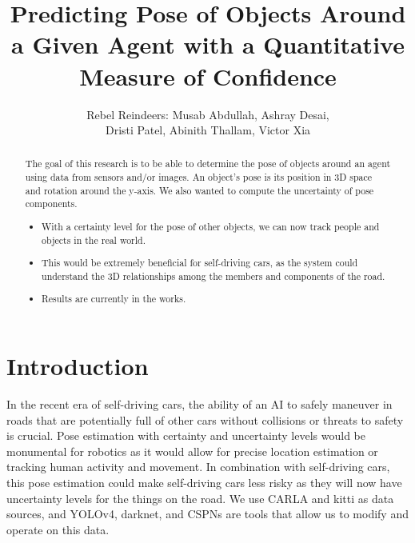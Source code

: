 \documentclass{article}
\title{Predicting Pose of Objects Around a Given Agent with a Quantitative Measure of Confidence}
\author{Rebel Reindeers: Musab Abdullah, Ashray Desai, \\Dristi Patel, Abinith Thallam, Victor Xia}
\date{}
\begin{document}
\maketitle

\begin{abstract}
The goal of this research is to be able to determine the pose of objects around an agent using data from sensors and/or images. An object's pose is its position in 3D space and rotation around the y-axis. We also wanted to compute the uncertainty of pose components. 
\begin{itemize}
    \item With a certainty level for the pose of other objects, we can now track people and objects in the real world.
    \item This would be extremely beneficial for self-driving cars, as the system could understand the 3D relationships among the members and components of the road.
    \item Results are currently in the works.
\end{itemize} 
\end{abstract}


\section{Introduction}
In the recent era of self-driving cars, the ability of an AI to safely maneuver in roads that are potentially full of other cars without collisions or threats to safety is crucial. Pose estimation with certainty and uncertainty levels would be monumental for robotics as it would allow for precise location estimation or tracking human activity and movement. In combination with self-driving cars, this pose estimation could make self-driving cars less risky as they will now have uncertainty levels for the things on the road. We use CARLA and kitti as data sources, and YOLOv4, darknet, and CSPNs are tools that allow us to modify and operate on this data. 
\end{document}
